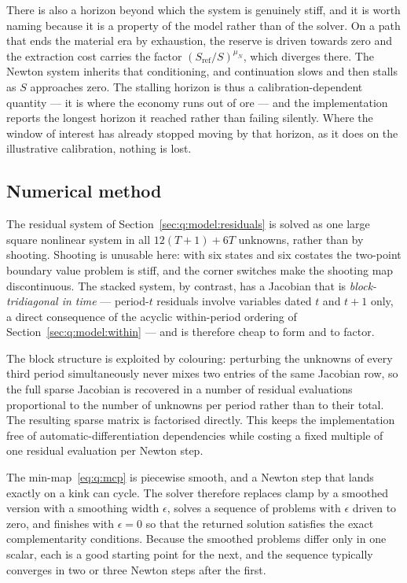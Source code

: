There is also a horizon beyond which the system is genuinely stiff, and it is worth naming because it is a property of the model rather than of the solver. On a path that ends the material era by exhaustion, the reserve is driven towards zero and the extraction cost carries the factor $\left(S_{\mathrm{ref}}/S\right)^{\mu_N}$, which diverges there. The Newton system inherits that conditioning, and continuation slows and then stalls as $S$ approaches zero. The stalling horizon is thus a calibration-dependent quantity --- it is where the economy runs out of ore --- and the implementation reports the longest horizon it reached rather than failing silently. Where the window of interest has already stopped moving by that horizon, as it does on the illustrative calibration, nothing is lost.

\subsection{Numerical method}\label{sec:q:sol:method}

 The residual system of Section~\ref{sec:q:model:residuals} is solved as one large square nonlinear system in all $12\left(T+1\right)+6T$ unknowns, rather than by shooting. Shooting is unusable here: with six states and six costates the two-point boundary value problem is stiff, and the corner switches make the shooting map discontinuous. The stacked system, by contrast, has a Jacobian that is \emph{block-tridiagonal in time} --- period-$t$ residuals involve variables dated $t$ and $t+1$ only, a direct consequence of the acyclic within-period ordering of Section~\ref{sec:q:model:within} --- and is therefore cheap to form and to factor.

 The block structure is exploited by colouring: perturbing the unknowns of every third period simultaneously never mixes two entries of the same Jacobian row, so the full sparse Jacobian is recovered in a number of residual evaluations proportional to the number of unknowns per period rather than to their total. The resulting sparse matrix is factorised directly. This keeps the implementation free of automatic-differentiation dependencies while costing a fixed multiple of one residual evaluation per Newton step.

 The min-map~\eqref{eq:q:mcp} is piecewise smooth, and a Newton step that lands exactly on a kink can cycle. The solver therefore replaces $\mathrm{clamp}$ by a smoothed version with a smoothing width $\epsilon$, solves a sequence of problems with $\epsilon$ driven to zero, and finishes with $\epsilon=0$ so that the returned solution satisfies the exact complementarity conditions. Because the smoothed problems differ only in one scalar, each is a good starting point for the next, and the sequence typically converges in two or three Newton steps after the first.

